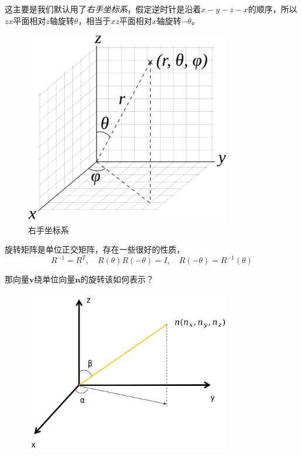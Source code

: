 \documentclass[hpyerref,UTF8,a4paper,titlepage,12pt,oneside]{ctexbook}
\theoremstyle{definition}
\begin{document}
这主要是我们默认用了\textit{右手坐标系}，假定逆时针是沿着$x-y-z-x$的顺序，所以$zx$平面相对$z$轴旋转$\theta$，相当于$xz$平面相对$x$轴旋转$-\theta$。

\begin{figure}[H]
	\begin{center}
		\includegraphics[width=0.8\textwidth]{./images/righthandless.png}
		\caption{右手坐标系}
	\end{center}
\end{figure}


旋转矩阵是单位正交矩阵，存在一些很好的性质，
$$
	R^{-1} = R^T, \quad R(\theta)R(-\theta) = I,\quad R(-\theta)=R^{-1}(\theta)
$$

那向量$\mathbf{v}$绕单位向量$\mathbf{n}$的旋转该如何表示？\\

\begin{figure}[H]
	\begin{center}
		\includegraphics[width=0.8\textwidth]{./images/axis_rotation.png}
	\end{center}
\end{figure}
\end{document}
